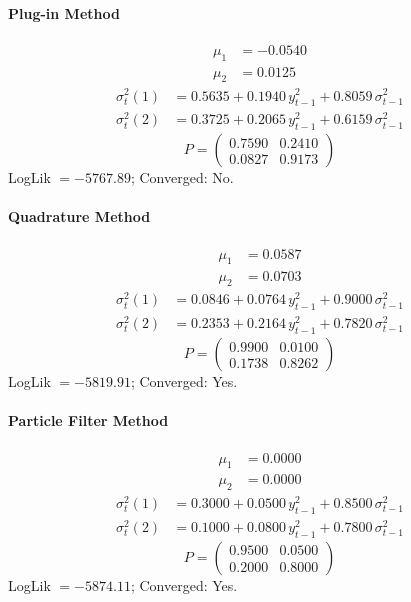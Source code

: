 \documentclass[11pt, a4paper]{article}
\begin{document}
\paragraph{Plug-in Method}
\begin{align}
\mu_{1} &= -0.0540 \\
\mu_{2} &= 0.0125
\end{align}
\begin{align}
\sigma^2_{t}(1) &= 0.5635 + 0.1940\, y_{t-1}^2 + 0.8059\, \sigma^2_{t-1} \\
\sigma^2_{t}(2) &= 0.3725 + 0.2065\, y_{t-1}^2 + 0.6159\, \sigma^2_{t-1}
\end{align}
\begin{equation}
P = \begin{pmatrix} 0.7590 & 0.2410 \\ 0.0827 & 0.9173 \end{pmatrix}
\end{equation}
LogLik $= -5767.89$; Converged: No.

\paragraph{Quadrature Method}
\begin{align}
\mu_{1} &= 0.0587 \\
\mu_{2} &= 0.0703
\end{align}
\begin{align}
\sigma^2_{t}(1) &= 0.0846 + 0.0764\, y_{t-1}^2 + 0.9000\, \sigma^2_{t-1} \\
\sigma^2_{t}(2) &= 0.2353 + 0.2164\, y_{t-1}^2 + 0.7820\, \sigma^2_{t-1}
\end{align}
\begin{equation}
P = \begin{pmatrix} 0.9900 & 0.0100 \\ 0.1738 & 0.8262 \end{pmatrix}
\end{equation}
LogLik $= -5819.91$; Converged: Yes.

\paragraph{Particle Filter Method}
\begin{align}
\mu_{1} &= 0.0000 \\
\mu_{2} &= 0.0000
\end{align}
\begin{align}
\sigma^2_{t}(1) &= 0.3000 + 0.0500\, y_{t-1}^2 + 0.8500\, \sigma^2_{t-1} \\
\sigma^2_{t}(2) &= 0.1000 + 0.0800\, y_{t-1}^2 + 0.7800\, \sigma^2_{t-1}
\end{align}
\begin{equation}
P = \begin{pmatrix} 0.9500 & 0.0500 \\ 0.2000 & 0.8000 \end{pmatrix}
\end{equation}
LogLik $= -5874.11$; Converged: Yes.
\end{document}
